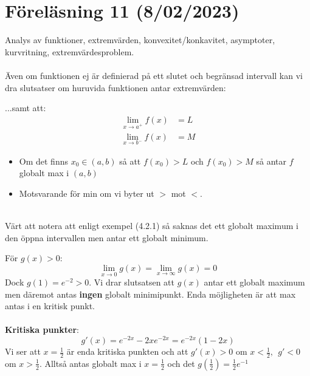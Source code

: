 \documentclass{report}
\begin{document}
\pagebreak
\section{Föreläsning 11 (8/02/2023)}
Analys av funktioner, extremvärden, konvexitet/konkavitet, asymptoter, kurvritning, extremvärdesproblem.\\\\

\noindent
Även om funktionen ej är definierad på ett slutet och begränsad intervall kan vi dra slutsatser om huruvida funktionen antar extremvärden:
{
...samt att:
\begin{align*}
	\lim_{x \to a^+} f(x) &= L\\
	\lim_{x \to b^-} f(x) &= M
\end{align*}
\begin{itemize}
	\item Om det finns $ x_0 \in (a,b) $ så att $ f(x_0) > L $ och $ f(x_0) > M $ så antar $ f $ globalt max i $ (a,b) $
	\item Motsvarande för min om vi byter ut $ > $ mot $ < $.
\end{itemize}

}

{
\\
Värt att notera att enligt exempel (4.2.1) så saknas det ett globalt maximum i den öppna intervallen men antar ett globalt minimum.
}

\pagebreak
{}
{
För $ g(x) > 0 $:
\begin{equation*}
\lim_{x \to 0} g(x) = \lim_{x \to \infty} g(x) = 0
\end{equation*}
Dock $ g(1) = e^{-2} > 0 $. Vi drar slutsatsen att $ g(x) $ antar ett globalt maximum men däremot antas \textbf{ingen} globalt minimipunkt. Enda möjligheten är att max antas i en kritisk punkt.\\\\

\textbf{Kritiska punkter}:
\begin{equation*}
	g'(x) = e^{-2x} - 2xe^{-2x} = e^{-2x}(1-2x)
\end{equation*}
Vi ser att $ x = \frac{1}{2}  $ är enda kritiska punkten och att $ g'(x) > 0 $ om $ x < \frac{1}{2},\:\: g' < 0 $ om $ x > \frac{1}{2}  $. Alltså antas globalt max i $ x = \frac{1}{2} $ och det $ g( \frac{1}{2} ) = \frac{1}{2} e^{-1} $ 
}
\end{document}
